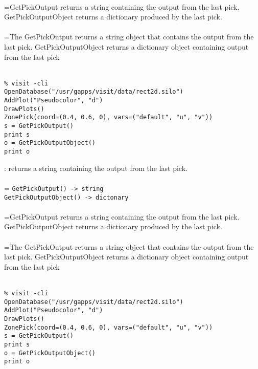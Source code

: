 \documentclass[10pt,a4paper]{report}
\begin{document}
 \\ 
\hangindent=\parindent GetPickOutput returns a string containing the output from the last pick. GetPickOutputObject returns a dictionary produced by the last pick. \\[-3mm] 

 \\ 
\hangindent=\parindent The GetPickOutput returns a string object that contains the output from the last pick. GetPickOutputObject returns a dictionary object containing output from the  last pick \\[-3mm] 

\\[-6mm]
\begin{verbatim}% visit -cli
OpenDatabase("/usr/gapps/visit/data/rect2d.silo")
AddPlot("Pseudocolor", "d")
DrawPlots()
ZonePick(coord=(0.4, 0.6, 0), vars=("default", "u", "v"))
s = GetPickOutput()
print s
o = GetPickOutputObject()
print o
\end{verbatim}
\newpage


{}
: returns a string containing the output from the last pick.\\[-3mm]

 \\ 
\hangindent=\parindent 
\verb!GetPickOutput() -> string!\\ 
\verb!GetPickOutputObject() -> dictonary!\\ [-3mm]

 \\ 
\hangindent=\parindent GetPickOutput returns a string containing the output from the last pick. GetPickOutputObject returns a dictionary produced by the last pick. \\[-3mm] 

 \\ 
\hangindent=\parindent The GetPickOutput returns a string object that contains the output from the last pick. GetPickOutputObject returns a dictionary object containing output from the  last pick \\[-3mm] 

\\[-6mm]
\begin{verbatim}% visit -cli
OpenDatabase("/usr/gapps/visit/data/rect2d.silo")
AddPlot("Pseudocolor", "d")
DrawPlots()
ZonePick(coord=(0.4, 0.6, 0), vars=("default", "u", "v"))
s = GetPickOutput()
print s
o = GetPickOutputObject()
print o
\end{verbatim}
\newpage
\end{document}
